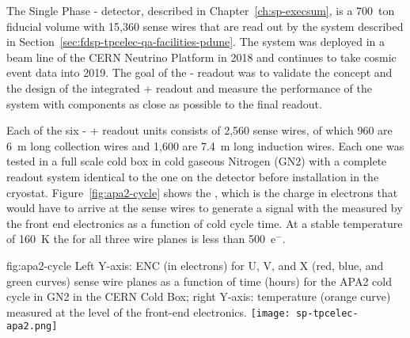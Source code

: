 
The Single Phase - detector, described in Chapter~\ref{ch:sp-execsum}, is a 700~ton fiducial volume  with 15,360 sense wires that are read out by the  system described in Section~\ref{sec:fdsp-tpcelec-qa-facilities-pdune}. The system was deployed in a beam line of the CERN Neutrino Platform in 2018 and continues to take cosmic event data into 2019. The goal of the -  readout was to validate the concept and the design of the integrated + readout and measure the performance of the  system with components as close as possible to the final   readout.

Each of the six - + readout units consists of 2,560 sense wires, of which 960 are \SI{6}{m} long collection wires and 1,600 are \SI{7.4}{m} long induction wires. Each one was tested in a full scale cold box in cold gaseous Nitrogen (GN2) with a complete  readout system identical to the one on the detector before installation in the cryostat. Figure~\ref{fig:apa2-cycle} shows the , which is the charge in electrons that would have to arrive at the sense wires to generate a signal with the \rms measured by the front end electronics as a function of cold cycle time. At a stable temperature of \SI{160}{K} the  for all three wire planes is less than 500~e$^-$.

\begin{dunefigure}
{fig:apa2-cycle}
{Left Y-axis: ENC (in electrons) for U, V, and X (red, blue, and green curves) sense wire planes as a function of time (hours) for the APA2 cold cycle in GN2 in the CERN Cold Box; right Y-axis: temperature (orange curve) measured at the level of the front-end electronics.}
\texttt{[image: sp-tpcelec-apa2.png]}
\end{dunefigure}

